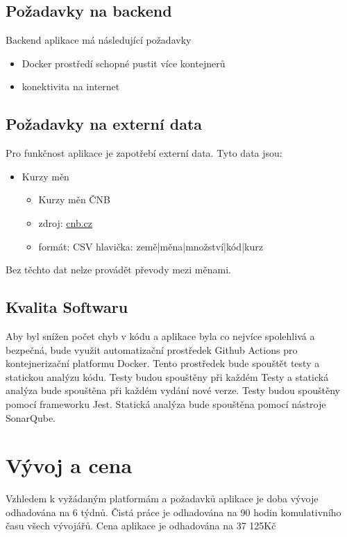 \documentclass[FM,SP]{tulthesis}
\begin{document}
\subsection{Požadavky na backend}
Backend aplikace má následující požadavky
\begin{itemize}
    \item Docker prostředí schopné pustit více kontejnerů
    \item konektivita na internet
\end{itemize}

\subsection{Požadavky na externí data}
Pro funkčnost aplikace je zapotřebí externí data.
Tyto data jsou:

\begin{itemize}
    \item Kurzy měn
          \begin{itemize}
              \item Kurzy měn ČNB
              \item zdroj: \href{https://www.cnb.cz/cs/financni_trhy/devizovy_trh/kurzy_devizoveho_trhu/denni_kurz.txt}{cnb.cz}
              \item formát: CSV
                    hlavička: země|měna|množství|kód|kurz
          \end{itemize}
\end{itemize}

Bez těchto dat nelze provádět převody mezi měnami.

\subsection{Kvalita Softwaru}
Aby byl snížen počet chyb v kódu a aplikace byla co nejvíce spolehlivá a bezpečná, bude využit automatizační prostředek Github Actions pro kontejnerizační platformu Docker. Tento prostředek bude spouštět testy a statickou analýzu kódu. Testy budou spouštěny při každém Testy a statická analýza bude spouštěna při každém vydání nové verze. Testy budou spouštěny pomocí frameworku Jest. Statická analýza bude spouštěna pomocí nástroje SonarQube.

\section{Vývoj a cena}
Vzhledem k vyžádaným platformám a požadavků aplikace je doba vývoje odhadována na 6 týdnů. Čistá práce je odhadována na 90 hodin komulativního času všech vývojářů. Cena aplikace je odhadována na 37 125Kč
\end{document}
